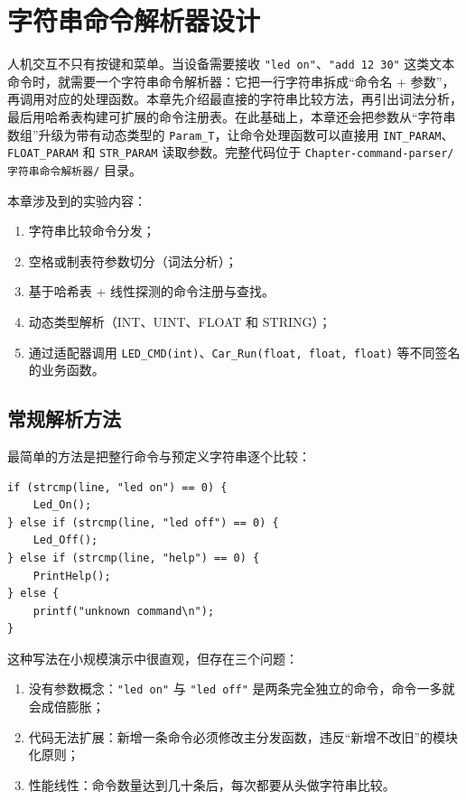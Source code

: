 \chapter{字符串命令解析器设计} \label{ch:command-parser}

人机交互不只有按键和菜单。当设备需要接收 \texttt{"led on"}、\texttt{"add 12 30"} 这类文本命令时，就需要一个字符串命令解析器：它把一行字符串拆成“命令名 + 参数”，再调用对应的处理函数。本章先介绍最直接的字符串比较方法，再引出词法分析，最后用哈希表构建可扩展的命令注册表。在此基础上，本章还会把参数从“字符串数组”升级为带有动态类型的 \texttt{Param\_T}，让命令处理函数可以直接用 \texttt{INT\_PARAM}、\texttt{FLOAT\_PARAM} 和 \texttt{STR\_PARAM} 读取参数。完整代码位于 \texttt{Chapter-command-parser/字符串命令解析器/} 目录。

\medskip 本章涉及到的实验内容：
\begin{enumerate}
\item 字符串比较命令分发；
\item 空格或制表符参数切分（词法分析）；
\item 基于哈希表 + 线性探测的命令注册与查找。
\item 动态类型解析（INT、UINT、FLOAT 和 STRING）；
\item 通过适配器调用 \texttt{LED\_CMD(int)}、\texttt{Car\_Run(float, float, float)} 等不同签名的业务函数。
\end{enumerate}

\section{常规解析方法}

最简单的方法是把整行命令与预定义字符串逐个比较：

\begin{lstlisting}[style=c]
if (strcmp(line, "led on") == 0) {
    Led_On();
} else if (strcmp(line, "led off") == 0) {
    Led_Off();
} else if (strcmp(line, "help") == 0) {
    PrintHelp();
} else {
    printf("unknown command\n");
}
\end{lstlisting}

这种写法在小规模演示中很直观，但存在三个问题：

\begin{enumerate}
\item 没有参数概念：\texttt{"led on"} 与 \texttt{"led off"} 是两条完全独立的命令，命令一多就会成倍膨胀；
\item 代码无法扩展：新增一条命令必须修改主分发函数，违反“新增不改旧”的模块化原则；
\item 性能线性：命令数量达到几十条后，每次都要从头做字符串比较。
\end{enumerate}

